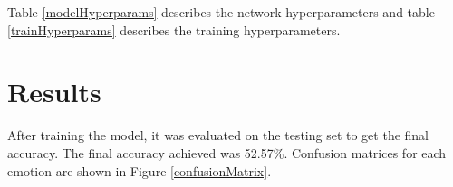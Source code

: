 \documentclass[conference]{IEEEtran}
\begin{document}
Table \ref{modelHyperparams} describes the network hyperparameters and table \ref{trainHyperparams} describes the training hyperparameters.

\begin{table}[h!]
	\caption{The model's hyperparameters.}
	\label{modelHyperparams}
\end{table}

\begin{table}[h!]
	\caption{The training hyperparameters.}
	\label{trainHyperparams}
\end{table}

\section{Results}

After training the model, it was evaluated on the testing set to get the final accuracy. The final accuracy achieved was 52.57\%. Confusion matrices for each emotion are shown in Figure \ref{confusionMatrix}.
\end{document}
